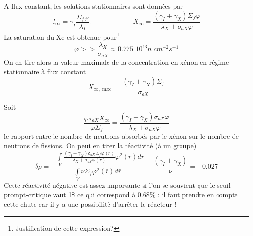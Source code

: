 	A flux constant, les solutions stationnaires sont données par
	\begin{equation}
	{I_\infty } = {\gamma _I}\frac{{{\Sigma _f}\varphi }}{{{\lambda _I}}},\qquad\qquad\qquad
	{X_\infty } = \frac{{({\gamma _I} + {\gamma _X}){\Sigma _f}\varphi }}{{{\lambda _X} + {\sigma
	 _{aX}}\varphi }}
	\end{equation}
	La saturation du Xe est obtenue pour\footnote{Justification de cette expression?}
	\begin{equation}
	\varphi  >  > \frac{{{\lambda _X}}}{{{\sigma _{aX}}}} \approx 0.775\,\,{10^{13}}n\;c{m^{ - 2}}{s^{
	 - 1}}
	\end{equation}
	On en tire alors la valeur maximale de la concentration en xénon en régime stationnaire à flux
	constant
	\begin{equation}
	{X_{\infty ,\max }} = \frac{{({\gamma _I} + {\gamma _X}){\Sigma _f}}}{{{\sigma _{aX}}}}
	\end{equation}
	
	
	Soit
	\begin{equation}
	\frac{{\varphi {\sigma _{aX}}{X_\infty }}}{{\varphi {\Sigma _f}}} = \frac{{({\gamma _I} + {\gamma
	 _X}){\sigma _{aX}}\varphi }}{{{\lambda _X} + {\sigma _{aX}}\varphi }}
	\end{equation}
	le rapport entre le nombre de neutrons absorbés par le xénon sur le nombre de neutrons de 
	fissions. On peut en tirer la réactivité (à un groupe)
	\begin{equation}
	\delta \rho  = \frac{{ - \int\limits_V   \frac{{({\gamma _I} + {\gamma _X}){\sigma _{aX}}{\Sigma
	 _f}\varphi (\bar r)}}{{{\lambda _X} + {\sigma _{aX}}\varphi (\bar r)}}{\varphi ^2}(\bar r)d\bar
	  r}}{{\int\limits_V    \nu {\Sigma _f}{\varphi ^2}(\bar r)d\bar r}}
	 - \frac{{({\gamma _I} + {\gamma _X})}}{\nu } =  - 0.027
	\end{equation}
	Cette réactivité négative est assez importante si l'on se souvient que le seuil prompt-critique
	vaut 1\$ ce qui correspond à 0.68\% : il faut prendre en compte cette chute car il y a une 
	possibilité d'arrêter le réacteur !
	
